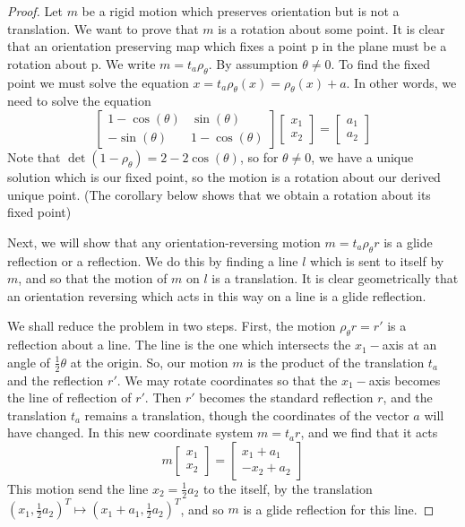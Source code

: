 \documentclass[12pt]{article}
\theoremstyle{definition}
\theoremstyle{remark}
\numberwithin{equation}{section}
\begin{document}
\begin{proof}
        Let $m$ be a rigid motion which preserves orientation but is not a translation. We want to prove that $m$ is a rotation about some point. It is clear that an orientation preserving map which fixes a point p in the plane must be a rotation about p. We write $m = t_a\rho_{\theta}$. By assumption $\theta \neq 0$. To find the fixed point we must solve the equation $x = t_a\rho_{\theta}(x) = \rho_{\theta}(x) + a$. In other words, we need to solve the equation \begin{equation}
                \begin{bmatrix} 1 - \cos(\theta) & \sin(\theta) \\ -\sin(\theta) & 1 - \cos(\theta) \end{bmatrix}\begin{bmatrix} x_1 \\ x_2 \end{bmatrix} = \begin{bmatrix} a_1 \\ a_2 \end{bmatrix}
        \end{equation}
        Note that $\det(1 - \rho_{\theta}) = 2 - 2\cos(\theta)$, so for $\theta \neq 0$, we have a unique solution which is our fixed point, so the motion is a rotation about our derived unique point. (The corollary below shows that we obtain a rotation about its fixed point)


        Next, we will show that any orientation-reversing motion $m = t_a\rho_{\theta}r$ is a glide reflection or a reflection. We do this by finding a line $l$ which is sent to itself by $m$, and so that the motion of $m$ on $l$ is a translation. It is clear geometrically that an orientation reversing which acts in this way on a line is a glide reflection.


        We shall reduce the problem in two steps. First, the motion $\rho_{\theta}r = r'$ is a reflection about a line. The line is the one which intersects the $x_1-$axis at an angle of $\frac{1}{2}\theta$ at the origin. So, our motion $m$ is the product of the translation $t_a$ and the reflection $r'$. We may rotate coordinates so that the $x_1-$axis becomes the line of reflection of $r'$. Then $r'$ becomes the standard reflection $r$, and the translation $t_a$ remains a translation, though the coordinates of the vector $a$ will have changed. In this new coordinate system $m =t_ar$, and we find that it acts \begin{equation}
                m\begin{bmatrix} x_1 \\ x_2 \end{bmatrix} = \begin{bmatrix} x_1 + a_1 \\ -x_2 + a_2 \end{bmatrix}
        \end{equation}
        This motion send the line $x_2 = \frac{1}{2}a_2$ to the itself, by the translation $(x_1,\frac{1}{2}a_2)^T\mapsto (x_1+a_1, \frac{1}{2}a_2)^T$, and so $m$ is a glide reflection for this line.
\end{proof}
\end{document}
